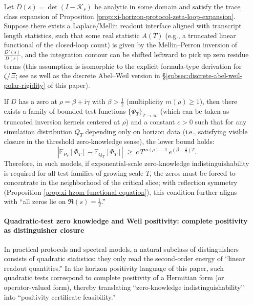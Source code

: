 \begin{proposition}\label{prop:xi-hzom-offcritical-zero-distinguisher}
Let \(D(s)=\det(I-\mathcal{K}_s)\) be analytic in some domain and satisfy the trace class expansion of Proposition \ref{prop:xi-horizon-protocol-zeta-loop-expansion}.
Suppose there exists a Laplace/Mellin readout interface aligned with transcript length statistics, such that some real statistic \(A(T)\) (e.g., a truncated linear functional of the closed-loop count) is given by the Mellin--Perron inversion of \(\frac{D'(s)}{D(s)}\), and the integration contour can be shifted leftward to pick up zero residue terms (this assumption is isomorphic to the explicit formula-type derivation for \(\zeta/\Xi\); see \cite{Connes1999TraceFormulaNCG} as well as the discrete Abel--Weil version in \S\ref{subsec:discrete-abel-weil-polar-rigidity} of this paper).
\par
If \(D\) has a zero at \(\rho=\beta+\mathrm{i}\gamma\) with \(\beta>\tfrac12\) (multiplicity \(m(\rho)\ge 1\)), then there exists a family of bounded test functions \(\{\Phi_T\}_{T\to\infty}\) (which can be taken as truncated inversion kernels centered at \(\rho\)) and a constant \(c>0\) such that for any simulation distribution \(Q_T\) depending only on horizon data (i.e., satisfying visible closure in the threshold zero-knowledge sense), the lower bound holds:
\[
\left|\mathbb{E}_{P_T}[\Phi_T]-\mathbb{E}_{Q_T}[\Phi_T]\right|
\ \ge\
c\,T^{m(\rho)-1}\,e^{(\beta-\frac12)T}.
\]
Therefore, in such models, if exponential-scale zero-knowledge indistinguishability is required for all test families of growing scale \(T\), the zeros must be forced to concentrate in the neighborhood of the critical slice; with reflection symmetry (Proposition \ref{prop:xi-hzom-functional-equation}), this condition further aligns with ``all zeros lie on \(\Re(s)=\tfrac12\).''
\end{proposition}

\paragraph{Quadratic-test zero knowledge and Weil positivity: complete positivity as distinguisher closure}
In practical protocols and spectral models, a natural subclass of distinguishers consists of quadratic statistics: they only read the second-order energy of ``linear readout quantities.''
In the horizon positivity language of this paper, such quadratic tests correspond to complete positivity of a Hermitian form (or operator-valued form), thereby translating ``zero-knowledge indistinguishability'' into ``positivity certificate feasibility.''

